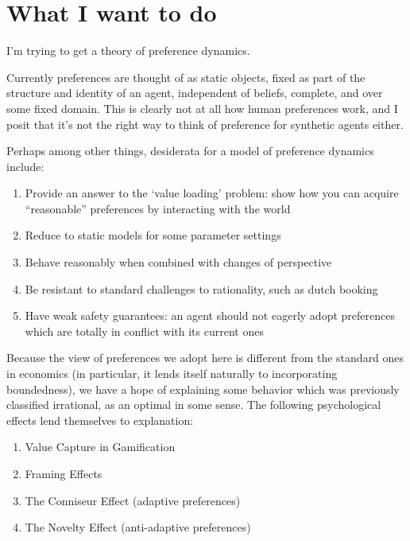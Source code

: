 \documentclass{article}
\begin{document}
	\section{What I want to do}
	I'm trying to get a theory of preference dynamics.
	
	Currently preferences are thought of as static objects, fixed as part of the structure and identity of an agent, independent of beliefs, complete, and over some fixed domain. This is clearly not at all how human preferences work, and I posit that it's not the right way to think of preference for synthetic agents either.
	
	Perhaps among other things, desiderata for a model of preference dynamics include:
	\begin{enumerate}[noitemsep]
		\item Provide an answer to the `value loading' problem: show how you can acquire ``reasonable'' preferences by interacting with the world
		\item Reduce to static models for some parameter settings
		\item Behave reasonably when combined with changes of perspective 
		\item Be resistant to standard challenges to rationality, such as dutch booking
		\item Have weak safety guarantees: an agent should not eagerly adopt preferences which are totally in conflict with its current ones
	\end{enumerate}
	
	Because the view of preferences we adopt here is different from the standard ones in economics (in particular, it lends itself naturally to incorporating boundedness), we have a hope of explaining some behavior which was previously classified irrational, as an optimal in some sense. The following psychological effects lend themselves to explanation:
	\begin{enumerate}[noitemsep]
		\item Value Capture in Gamification
		\item Framing Effects
		\item The Conniseur Effect (adaptive preferences)
		\item The Novelty Effect (anti-adaptive preferences)
	\end{enumerate}
	
\end{document}
